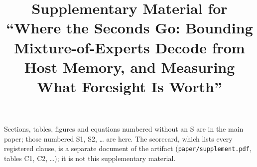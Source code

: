 \documentclass[conference,onecolumn]{IEEEtran}
\begin{document}
\sloppy
\title{Supplementary Material for ``Where the Seconds Go: Bounding Mixture-of-Experts Decode from Host Memory, and
Measuring What Foresight Is Worth''}
\maketitle
\noindent Sections, tables, figures and equations numbered without an S are in the main paper; those numbered S1, S2,
\ldots{} are here. The scorecard, which lists every registered clause, is a separate document of the artifact
(\texttt{paper/supplement.pdf}, tables C1, C2, \ldots); it is not this supplementary material.

\appendices
{}   %


\clearpage


\end{document}
